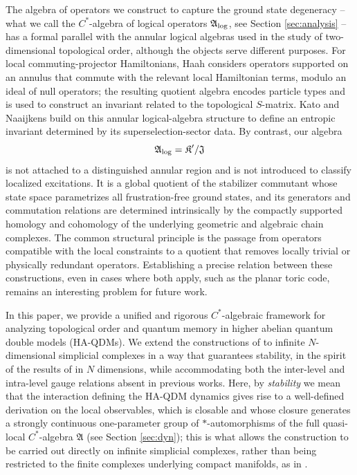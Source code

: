 \documentclass[a4paper,12pt,twoside,reqno]{amsart}
\theoremstyle{plain}
\theoremstyle{definition}
\theoremstyle{remark}
\numberwithin{equation}{section}
\numberwithin{figure}{section}
\numberwithin{table}{section}
\begin{document}
	The algebra of operators we construct to capture the ground state degeneracy -- what we call the $C^*$-algebra of logical operators $\mathfrak{A}_{\rm log}$, see Section \ref{sec:analysis} -- has a formal parallel with the annular logical algebras used in the study of two-dimensional topological order, although the objects serve different purposes. For local commuting-projector Hamiltonians, Haah \cite{Haah2016} considers operators supported on an annulus that commute with the relevant local Hamiltonian terms, modulo an ideal of null operators; the resulting quotient algebra encodes particle types and is used to construct an invariant related to the topological \(S\)-matrix. Kato and Naaijkens \cite{KatoNaaijkens2020} build on this annular logical-algebra structure to define an entropic invariant determined by its superselection-sector data. By contrast, our algebra
	\[
	\mathfrak{A}_{\rm log}=\mathfrak{K}'/\mathfrak{J}
	\]
	is not attached to a distinguished annular region and is not introduced to classify localized excitations. It is a global quotient of the stabilizer commutant whose state space parametrizes all frustration-free ground states, and its generators and commutation relations are determined intrinsically by the compactly supported homology and cohomology of the underlying geometric and algebraic chain complexes. The common structural principle is the passage from operators compatible with the local constraints to a quotient that removes locally trivial or physically redundant operators. Establishing a precise relation between these constructions, even in cases where both apply, such as the planar toric code, remains an interesting problem for future work.
	
	\medskip
	
	In this paper, we provide a unified and rigorous $C^*$-algebraic framework for analyzing topological order and quantum memory in higher abelian quantum double models (HA-QDMs). We extend the constructions of \cite{dealmeida2017topological} to infinite $N$-dimensional simplicial complexes in a way that guarantees stability, in the spirit of the results of \cite{Vrana} in $N$ dimensions, while accommodating both the inter-level and intra-level gauge relations absent in previous works.  Here, by \emph{stability} we mean that the interaction defining the HA-QDM dynamics gives rise to a well-defined derivation on the local observables, which is closable and whose closure generates a strongly continuous one-parameter group of $*$-automorphisms of the full quasi-local $C^*$-algebra $\mathfrak{A}$ (see Section \ref{sec:dyn}); this is what allows the construction to be carried out directly on infinite simplicial complexes, rather than being restricted to the finite complexes underlying compact manifolds, as in \cite{Lorca2025,dealmeida2017topological}.
	
\end{document}
